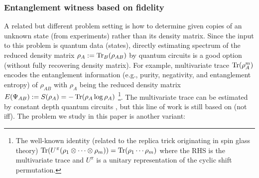 \documentclass[
aps,
pra,
twocolumn,
floatfix,
]{revtex4-2}
\theoremstyle{plain}
\theoremstyle{definition}
\newcommand{\dm}{\rho}
\newcommand{\U}{U}
\begin{document}
\subsubsection{Entanglement witness based on fidelity}\label{sec:entanglement_witness}
A related but different problem setting is how to determine  given copies of an unknown state (from experiments) rather than its density matrix.
Since the input to this problem is quantum data (states), directly estimating spectrum of the reduced density matrix $\rho_A:=\Tr_B(\rho_{AB})$ by quantum circuits is a good option (without fully recovering density matrix).
For example, multivariate trace $\Tr(\dm_A^m)$ encodes the entanglement information (e.g., purity, negativity, and entanglement entropy) of $\dm_{AB}$ with $\dm_A$ being the  reduced density matrix
$E(\Psi_{AB}):= S(\dm_A) = -\Tr(\dm_A \log \dm_A)$
 \cite{ekertDirectEstimationsLinear2002} \cite{horodeckiDirectDetectionQuantum2002}
\footnote{
	The well-known identity (related to the replica trick originating in spin glass theory)
		$\Tr(\U^{\pi} (\dm_1 \otimes \cdots \otimes \dm_m) ) = 
		\Tr(\dm_1\cdots \dm_m) $
	where the RHS is the multivariate trace and $\U^{\pi}$ is a unitary representation of the cyclic shift permutation.
}.
The multivariate trace can be estimated by constant depth quantum circuits \cite{johriEntanglementSpectroscopyQuantum2017}  \cite{quekMultivariateTraceEstimation2022}, but this line of work is still based on  (not iff).
The problem we study in this paper is another variant:
\end{document}
